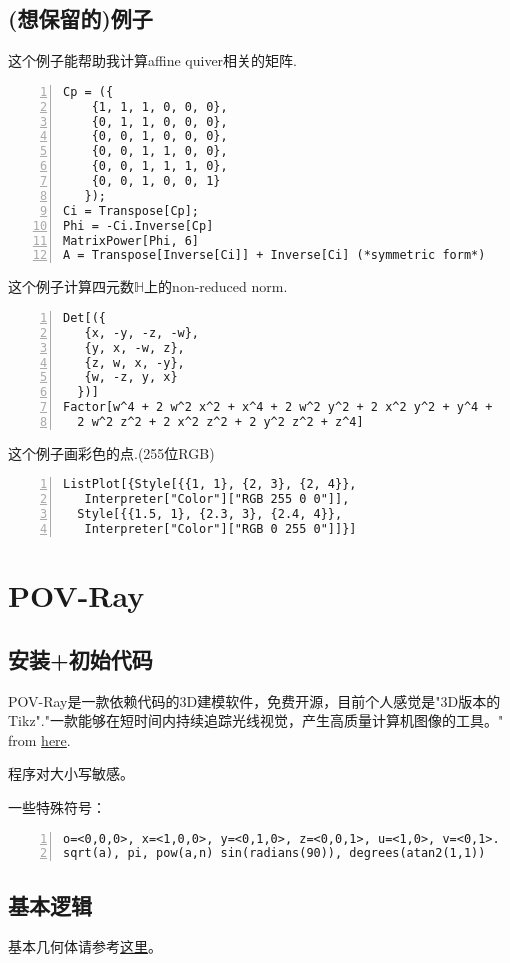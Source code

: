\documentclass[11pt]{amsart}
\begin{document}
\subsection{(想保留的)例子}

这个例子能帮助我计算affine quiver相关的矩阵.
\begin{lstlisting}[numbers=left,numberstyle=\tiny,numbersep=10pt]
Cp = ({
    {1, 1, 1, 0, 0, 0},
    {0, 1, 1, 0, 0, 0},
    {0, 0, 1, 0, 0, 0},
    {0, 0, 1, 1, 0, 0},
    {0, 0, 1, 1, 1, 0},
    {0, 0, 1, 0, 0, 1}
   });
Ci = Transpose[Cp];
Phi = -Ci.Inverse[Cp]
MatrixPower[Phi, 6]
A = Transpose[Inverse[Ci]] + Inverse[Ci] (*symmetric form*)
\end{lstlisting}
这个例子计算四元数$\mathbb{H}$上的non-reduced norm.
\begin{lstlisting}[numbers=left,numberstyle=\tiny,numbersep=10pt]
Det[({
   {x, -y, -z, -w},
   {y, x, -w, z},
   {z, w, x, -y},
   {w, -z, y, x}
  })]
Factor[w^4 + 2 w^2 x^2 + x^4 + 2 w^2 y^2 + 2 x^2 y^2 + y^4 + 
  2 w^2 z^2 + 2 x^2 z^2 + 2 y^2 z^2 + z^4]
\end{lstlisting}
这个例子画彩色的点.(255位RGB)
\begin{lstlisting}[numbers=left,numberstyle=\tiny,numbersep=10pt]
ListPlot[{Style[{{1, 1}, {2, 3}, {2, 4}}, 
   Interpreter["Color"]["RGB 255 0 0"]], 
  Style[{{1.5, 1}, {2.3, 3}, {2.4, 4}}, 
   Interpreter["Color"]["RGB 0 255 0"]]}]
\end{lstlisting}
\section{POV-Ray}
\subsection{安装+初始代码}
POV-Ray是一款依赖代码的3D建模软件，免费开源，目前个人感觉是"3D版本的Tikz"."一款能够在短时间内持续追踪光线视觉，产生高质量计算机图像的工具。" from \href{https://blog.csdn.net/zhr_hadoop/article/details/51289804}{here}.

程序对大小写敏感。

一些特殊符号：
\begin{lstlisting}[numbers=left,numberstyle=\tiny,numbersep=10pt]
o=<0,0,0>, x=<1,0,0>, y=<0,1,0>, z=<0,0,1>, u=<1,0>, v=<0,1>.
sqrt(a), pi, pow(a,n) sin(radians(90)), degrees(atan2(1,1))
\end{lstlisting}
\subsection{基本逻辑}
基本几何体请参考\href{http://www.f-lohmueller.de/pov_tut/all_shapes/shapes000e.htm}{这里}。
\end{document}
